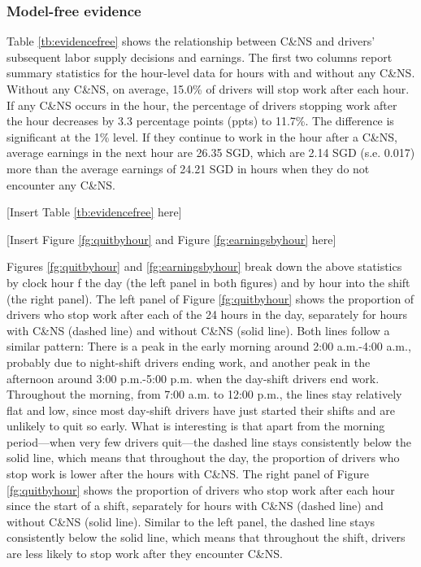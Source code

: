 \documentclass[reviewmode,AEJ]{AEA}
\begin{document}
\subsubsection{Model-free evidence}
Table \ref{tb:evidencefree} shows the relationship between C\&NS and drivers' subsequent labor supply 
decisions and earnings. The first two columns report summary statistics for the hour-level data for hours 
with and without any C\&NS. Without any C\&NS, on average, 15.0\% of drivers will stop work after each hour.
If any C\&NS occurs in the hour, the percentage of drivers stopping work after the hour decreases by 3.3
percentage points (ppts) to 11.7\%. The difference is significant at the 1\% level. If they continue to 
work in the hour after a C\&NS, average earnings in the next hour are 26.35 SGD, which are 2.14 SGD
(s.e. 0.017) more than the average earnings of 24.21 SGD in hours when they do not encounter any C\&NS. 

\begin{center}
	[Insert Table \ref{tb:evidencefree} here]
\end{center}

\begin{center}
	[Insert Figure \ref{fg:quitbyhour} and Figure \ref{fg:earningsbyhour} here]
\end{center}


Figures \ref{fg:quitbyhour} and \ref{fg:earningsbyhour} break down the above statistics by clock hour 
f the day (the left panel in both figures) and by hour into the shift (the right panel). 
The left panel of Figure \ref{fg:quitbyhour} shows the proportion of drivers who stop work after each
of the 24 hours in the day, separately for hours with C\&NS (dashed line) and without C\&NS (solid line).
Both lines follow a similar pattern: There is a peak in the early morning around 2:00 a.m.-4:00 a.m., 
probably due to night-shift drivers ending work, and another peak in the afternoon around 3:00 p.m.-5:00 p.m.
when the day-shift drivers end work. Throughout the morning, from 7:00 a.m. to 12:00 p.m., the lines stay
relatively flat and low, since most day-shift drivers have just started their shifts and are unlikely to 
quit so early. What is interesting is that apart from the morning period---when very few drivers quit---the 
dashed line stays consistently below the solid line, which means that throughout  the day, the proportion
of drivers who stop work is lower after the hours with C\&NS. The right panel of Figure \ref{fg:quitbyhour}
shows the proportion of drivers who stop work after each hour since the start of a shift, separately for
hours with C\&NS (dashed line) and without C\&NS (solid line). Similar to the left panel, the dashed line
stays consistently below the solid line, which means that throughout the shift, drivers are less likely to
stop work after they encounter C\&NS.
\end{document}

